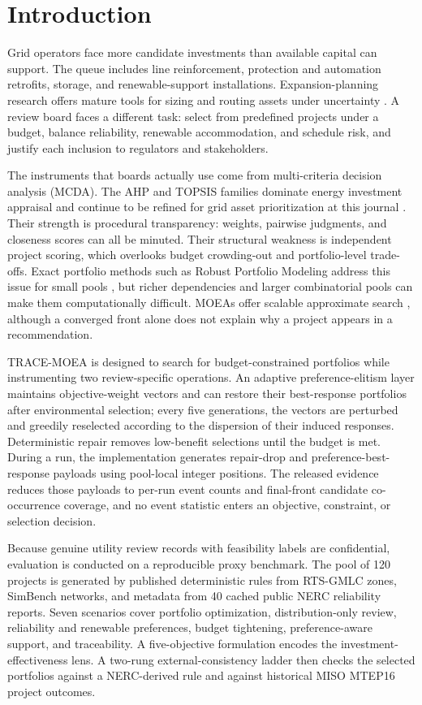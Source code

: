 \documentclass[energies,article,submit,moreauthors]{Definitions/mdpi}
\begin{document}
\section{Introduction}\label{introduction}

Grid operators face more candidate investments than available capital can support. The queue includes line reinforcement, protection and automation retrofits, storage, and renewable-support installations. Expansion-planning research offers mature tools for sizing and routing assets under uncertainty \cite{ref1,ref2}. A review board faces a different task: select from predefined projects under a budget, balance reliability, renewable accommodation, and schedule risk, and justify each inclusion to regulators and stakeholders.

The instruments that boards actually use come from multi-criteria decision analysis (MCDA). The AHP and TOPSIS families dominate energy investment appraisal \cite{ref3,ref4} and continue to be refined for grid asset prioritization at this journal \cite{ref5}. Their strength is procedural transparency: weights, pairwise judgments, and closeness scores can all be minuted. Their structural weakness is independent project scoring, which overlooks budget crowding-out and portfolio-level trade-offs. Exact portfolio methods such as Robust Portfolio Modeling address this issue for small pools \cite{ref6,ref7}, but richer dependencies and larger combinatorial pools can make them computationally difficult. MOEAs offer scalable approximate search \cite{ref8,ref9}, although a converged front alone does not explain why a project appears in a recommendation.

TRACE-MOEA is designed to search for budget-constrained portfolios while instrumenting two review-specific operations. An adaptive preference-elitism layer maintains objective-weight vectors and can restore their best-response portfolios after environmental selection; every five generations, the vectors are perturbed and greedily reselected according to the dispersion of their induced responses. Deterministic repair removes low-benefit selections until the budget is met. During a run, the implementation generates repair-drop and preference-best-response payloads using pool-local integer positions. The released evidence reduces those payloads to per-run event counts and final-front candidate co-occurrence coverage, and no event statistic enters an objective, constraint, or selection decision.

Because genuine utility review records with feasibility labels are confidential, evaluation is conducted on a reproducible proxy benchmark. The pool of 120 projects is generated by published deterministic rules from RTS-GMLC zones, SimBench networks, and metadata from 40 cached public NERC reliability reports. Seven scenarios cover portfolio optimization, distribution-only review, reliability and renewable preferences, budget tightening, preference-aware support, and traceability. A five-objective formulation encodes the investment-effectiveness lens. A two-rung external-consistency ladder then checks the selected portfolios against a NERC-derived rule and against historical MISO MTEP16 project outcomes.
\end{document}
